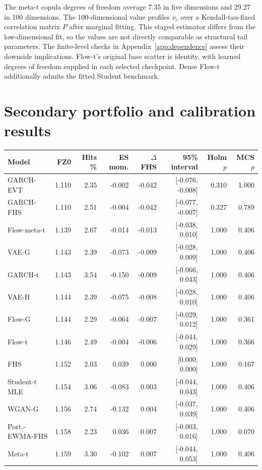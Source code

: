 \documentclass[11pt]{article}
\theoremstyle{definition}\newtheorem{definition}[theorem]{Definition}
\theoremstyle{remark}\newtheorem{remark}[theorem]{Remark}
\begin{document}
The meta-$t$ copula degrees of freedom average 7.35 in five dimensions and 29.27 in 100 dimensions. The 100-dimensional value profiles $\nu_c$ over a Kendall-tau-fixed correlation matrix $P$ after marginal fitting. This staged estimator differs from the low-dimensional fit, so the values are not directly comparable as structural tail parameters. The finite-level checks in Appendix~\ref{app:dependence} assess their downside implications. Flow-t's original base scatter is identity, with learned degrees of freedom supplied in each selected checkpoint. Dense Flow-t additionally admits the fitted Student benchmark.
\FloatBarrier
\section{Secondary portfolio and calibration results}
\begin{table}[htbp]
\centering\footnotesize
\setlength{\tabcolsep}{4pt}
\begin{tabular}{lrrrrrrr}
\toprule
Model & FZ0 & Hits \% & ES mom. & $\Delta$ FHS & 95\% interval & Holm $p$ & MCS $p$ \\
\midrule
GARCH-EVT & 1.110 & 2.35 & -0.002 & -0.042 & [-0.076, -0.008] & 0.310 & 1.000 \\
GARCH-FHS & 1.110 & 2.51 & -0.004 & -0.042 & [-0.077, -0.007] & 0.327 & 0.789 \\
Flow-meta-t & 1.139 & 2.67 & -0.014 & -0.013 & [-0.038, 0.010] & 1.000 & 0.406 \\
VAE-G & 1.143 & 2.39 & -0.073 & -0.009 & [-0.028, 0.009] & 1.000 & 0.406 \\
GARCH-t & 1.143 & 3.54 & -0.150 & -0.009 & [-0.066, 0.043] & 1.000 & 0.406 \\
VAE-H & 1.144 & 2.39 & -0.075 & -0.008 & [-0.028, 0.010] & 1.000 & 0.406 \\
Flow-G & 1.144 & 2.29 & -0.064 & -0.007 & [-0.029, 0.012] & 1.000 & 0.361 \\
Flow-t & 1.146 & 2.49 & -0.004 & -0.006 & [-0.044, 0.029] & 1.000 & 0.366 \\
FHS & 1.152 & 2.03 & 0.039 & 0.000 & [0.000, 0.000] & 1.000 & 0.167 \\
Student-$t$ MLE & 1.154 & 3.06 & -0.083 & 0.003 & [-0.044, 0.043] & 1.000 & 0.406 \\
WGAN-G & 1.156 & 2.74 & -0.132 & 0.004 & [-0.037, 0.039] & 1.000 & 0.406 \\
Port.-EWMA-FHS & 1.158 & 2.23 & 0.036 & 0.007 & [-0.003, 0.016] & 1.000 & 0.070 \\
Meta-t & 1.159 & 3.30 & -0.102 & 0.007 & [-0.044, 0.053] & 1.000 & 0.406 \\

\end{tabular}
\end{table}
\end{document}
